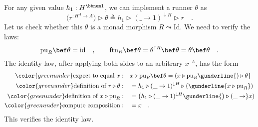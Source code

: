 For any given value $h_{1}:H^{\bbnum 1}$, we can implement a runner
$\theta$ as
\begin{equation}
\big(r^{:H^{A}\rightarrow A}\big)\triangleright\theta\triangleq h_{1}\triangleright(\_\rightarrow1)^{\downarrow H}\triangleright r\quad.\label{eq:rigid-monad-base-runner-1}
\end{equation}
Let us check whether this $\theta$ is a monad morphism $R\leadsto\text{Id}$.
We need to verify the laws:
\[
\text{pu}_{R}\bef\theta=\text{id}\quad,\quad\quad\text{ftn}_{R}\bef\theta=\theta^{\uparrow R}\bef\theta=\theta\bef\theta\quad.
\]
The identity law, after applying both sides to an arbitrary $x^{:A}$,
has the form
\begin{align*}
{\color{greenunder}\text{expect to equal }x:}\quad & x\triangleright\text{pu}_{R}\bef\theta=(x\triangleright\text{pu}_{R}\gunderline{)\triangleright\theta}\\
{\color{greenunder}\text{definition of }r\triangleright\theta:}\quad & =h_{1}\triangleright(\_\rightarrow1)^{\downarrow H}\triangleright(\gunderline{x\triangleright\text{pu}_{R}})\\
{\color{greenunder}\text{definition of }x\triangleright\text{pu}_{R}:}\quad & =\big(h_{1}\triangleright(\_\rightarrow1)^{\downarrow H}\gunderline{\big)\triangleright(\_\rightarrow}x)\\
{\color{greenunder}\text{compute composition}:}\quad & =x\quad.
\end{align*}
This verifies the identity law. 

